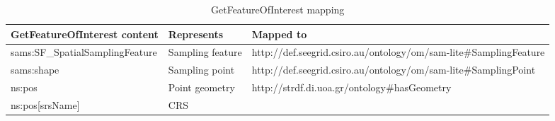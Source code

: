 \begin{sidewaystable}[!htbp]
	\centering
	\caption{GetFeatureOfInterest mapping}
	\label{map:getFOI}
		\begin{tabular}{l|l|l}
			GetFeatureOfInterest content    & Represents       & Mapped to                                                         \\ \hline
			sams:SF\_SpatialSamplingFeature & Sampling feature & http://def.seegrid.csiro.au/ontology/om/sam-lite\#SamplingFeature \\
			sams:shape                      & Sampling point   & http://def.seegrid.csiro.au/ontology/om/sam-lite\#SamplingPoint   \\
			ns:pos                          & Point geometry   & \multirow{2}{*}{http://strdf.di.uoa.gr/ontology\#hasGeometry}     \\
			ns:pos{[}srsName{]}             & CRS              &                                                                  
		\end{tabular}
\end{sidewaystable}